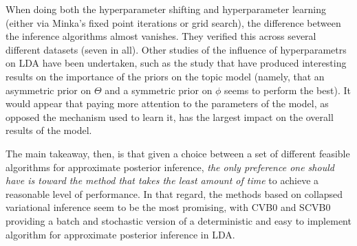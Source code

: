\documentclass[11pt]{article}
\begin{document}
When doing both the hyperparameter shifting and hyperparameter learning
(either via Minka's fixed point iterations or grid search), the difference
between the inference algorithms almost vanishes. They verified this across
several different datasets (seven in all). Other studies of the influence
of hyperparametrs on LDA have been undertaken, such as the
\citet*{Wallach:2009:NIPS} study that have produced interesting results on
the importance of the priors on the topic model (namely, that an asymmetric
prior on $\Theta$ and a symmetric prior on $\phi$ seems to perform the
best). It would appear that paying more attention to the parameters of the
model, as opposed the mechanism used to learn it, has the largest impact on
the overall results of the model.

The main takeaway, then, is that given a choice between a set of different
feasible algorithms for approximate posterior inference, \emph{the only
preference one should have is toward the method that takes the least amount
of time} to achieve a reasonable level of performance. In that regard, the
methods based on collapsed variational inference seem to be the most
promising, with CVB0 and SCVB0 providing a batch and stochastic version of
a deterministic and easy to implement algorithm for approximate posterior
inference in LDA.

\small


\end{document}
